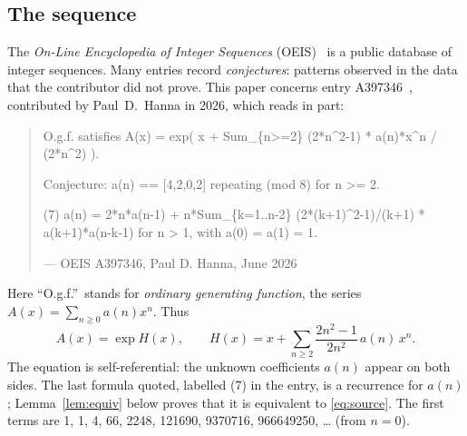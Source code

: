 \documentclass[11pt,a4paper]{article}
\theoremstyle{definition}
\theoremstyle{remark}
\begin{document}
\subsection{The sequence}\label{sec:sequence}
The \emph{On-Line Encyclopedia of Integer Sequences} (OEIS)~\cite{oeisdb} is a public database of integer sequences.
Many entries record \emph{conjectures}: patterns observed in the data that the contributor did not prove. This paper
concerns entry A397346~\cite{oeis}, contributed by Paul~D.~Hanna in 2026, which reads in part:
\begin{quote}\small\ttfamily\raggedright O.g.f. satisfies A(x) = exp( x + Sum\_\{n>=2\} (2*n\^{}2-1) * a(n)*x\^{}n / (2*n\^{}2) ).\par\smallskip Conjecture: a(n) == [4,2,0,2] repeating (mod 8) for n >= 2.\par\smallskip (7) a(n) = 2*n*a(n-1) + n*Sum\_\{k=1..n-2\} (2*(k+1)\^{}2-1)/(k+1) * a(k+1)*a(n-k-1) for n > 1, with a(0) = a(1) = 1.\par\smallskip\hfill\textrm{--- OEIS A397346, Paul D. Hanna, June 2026}\end{quote}

Here ``O.g.f.''\ stands for \emph{ordinary generating function}, the series $A(x)=\sum_{n\ge0}a(n)x^n$. Thus
\begin{equation}\label{eq:source}
A(x)=\exp H(x),\qquad H(x)=x+\sum_{n\ge2}\frac{2n^2-1}{2n^2}\,a(n)\,x^n .
\end{equation}
The equation is self-referential: the unknown coefficients $a(n)$ appear on both sides. The last formula quoted, labelled
(7) in the entry, is a recurrence for $a(n)$; Lemma~\ref{lem:equiv} below proves that it is equivalent to
\eqref{eq:source}. The first terms are 1, 1, 4, 66, 2248, 121690, 9370716, 966649250, \dots{} (from $n=0$).
\end{document}
